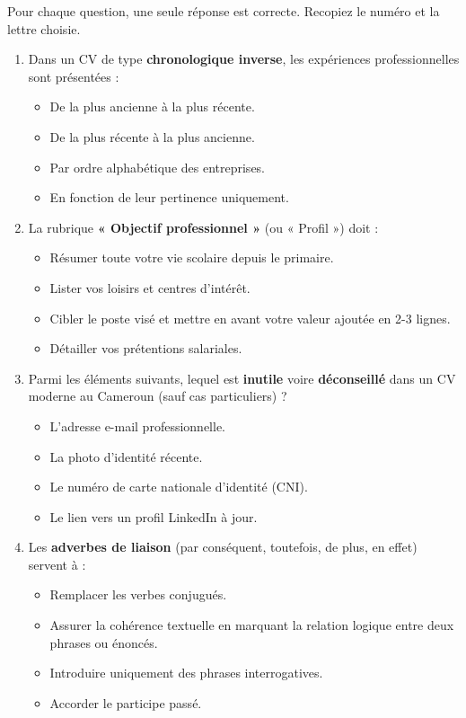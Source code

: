 \documentclass[11pt]{article}
\begin{document}
\begin{exercice}
Pour chaque question, une seule réponse est correcte. Recopiez le numéro et la lettre choisie.
\begin{enumerate}
\item Dans un CV de type \textbf{chronologique inverse}, les expériences professionnelles sont présentées :
\begin{itemize}
\item[A.] De la plus ancienne à la plus récente.
\item[B.] De la plus récente à la plus ancienne.
\item[C.] Par ordre alphabétique des entreprises.
\item[D.] En fonction de leur pertinence uniquement.
\end{itemize}

\item La rubrique \textbf{« Objectif professionnel »} (ou « Profil ») doit :
\begin{itemize}
\item[A.] Résumer toute votre vie scolaire depuis le primaire.
\item[B.] Lister vos loisirs et centres d'intérêt.
\item[C.] Cibler le poste visé et mettre en avant votre valeur ajoutée en 2-3 lignes.
\item[D.] Détailler vos prétentions salariales.
\end{itemize}

\item Parmi les éléments suivants, lequel est \textbf{inutile} voire \textbf{déconseillé} dans un CV moderne au Cameroun (sauf cas particuliers) ?
\begin{itemize}
\item[A.] L'adresse e-mail professionnelle.
\item[B.] La photo d'identité récente.
\item[C.] Le numéro de carte nationale d'identité (CNI).
\item[D.] Le lien vers un profil LinkedIn à jour.
\end{itemize}

\item Les \textbf{adverbes de liaison} (par conséquent, toutefois, de plus, en effet) servent à :
\begin{itemize}
\item[A.] Remplacer les verbes conjugués.
\item[B.] Assurer la cohérence textuelle en marquant la relation logique entre deux phrases ou énoncés.
\item[C.] Introduire uniquement des phrases interrogatives.
\item[D.] Accorder le participe passé.
\end{itemize}
\end{enumerate}
\end{exercice}
\end{document}
